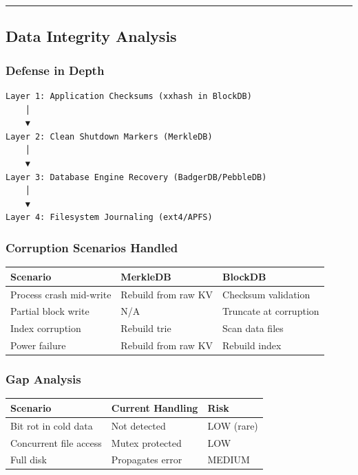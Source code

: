 \documentclass[
]{article}
\newcounter{none} %
\begin{document}
\begin{center}\rule{0.5\linewidth}{0.5pt}\end{center}

\subsection{Data Integrity Analysis}\label{data-integrity-analysis}

\subsubsection{Defense in Depth}\label{defense-in-depth}

\begin{verbatim}
Layer 1: Application Checksums (xxhash in BlockDB)
    │
    ▼
Layer 2: Clean Shutdown Markers (MerkleDB)
    │
    ▼
Layer 3: Database Engine Recovery (BadgerDB/PebbleDB)
    │
    ▼
Layer 4: Filesystem Journaling (ext4/APFS)
\end{verbatim}

\subsubsection{Corruption Scenarios
Handled}\label{corruption-scenarios-handled}

{\def\LTcaptype{none} %
\begin{longtable}[]{@{}lll@{}}
\toprule\noalign{}
Scenario & MerkleDB & BlockDB \\
\midrule\noalign{}
\endhead
\bottomrule\noalign{}
\endlastfoot
Process crash mid-write & Rebuild from raw KV & Checksum validation \\
Partial block write & N/A & Truncate at corruption \\
Index corruption & Rebuild trie & Scan data files \\
Power failure & Rebuild from raw KV & Rebuild index \\
\end{longtable}
}

\subsubsection{Gap Analysis}\label{gap-analysis}

{\def\LTcaptype{none} %
\begin{longtable}[]{@{}lll@{}}
\toprule\noalign{}
Scenario & Current Handling & Risk \\
\midrule\noalign{}
\endhead
\bottomrule\noalign{}
\endlastfoot
Bit rot in cold data & Not detected & LOW (rare) \\
Concurrent file access & Mutex protected & LOW \\
Full disk & Propagates error & MEDIUM \\
\end{longtable}
}
\end{document}
